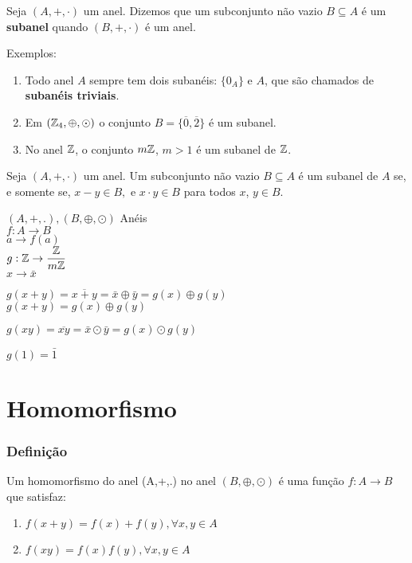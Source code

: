 \begin{definicao}
	Seja $(A,+,\cdot)$ um anel. Dizemos que um subconjunto n{\~a}o vazio $B\subseteq A$ {\'e} um \textbf{subanel} quando $(B, + , \cdot)$ \'e um anel.
\end{definicao}

Exemplos:
\begin{enumerate}
\item Todo anel $A$ sempre tem dois suban{\'e}is: $\{0_{A}\}$ e $A$, que s{\~a}o chamados de \textbf{suban{\'e}is triviais}.
\item Em $(\mathbb{Z}_4,\oplus,\odot)$ o conjunto $B = \{\overline{0}, \overline{2}\}$ \'e um subanel.
\item No anel $\mathbb{Z}$, o conjunto $m\mathbb{Z}$, $m > 1$ {\'e} um subanel de $\mathbb{Z}$.
\end{enumerate}

\begin{proposicao}
	Seja $(A,+,\cdot)$ um anel. Um subconjunto n{\~a}o vazio $B\subseteq A$ {\'e} um subanel de $A$ se, e somente se, $x - y \in B,$ e $x\cdot y \in B$ para todos $x$, $y\in B$.
\end{proposicao}

$(A,+,.),(B,\oplus,\odot)$ An{\'e}is\\
$f:A\rightarrow B$\\
$a\rightarrow f(a)$\\
$g:\mathbb{Z}\rightarrow \displaystyle\frac{\mathbb{Z}}{m\mathbb{Z}}$\\
$x\rightarrow\bar{x}$

$g(x+y)=\overline{x+y}=\bar{x}\oplus\bar{y}=g(x)\oplus g(y)$\\
$g(x+y)=g(x)\oplus g(y)$

$g(xy)=\overline{xy}=\bar{x}\odot\bar{y}=g(x)\odot g(y)$

$g(1)=\bar{1}$

\section{Homomorfismo}
\subsubsection{Defini{\c c}{\~a}o}

\begin{definicao}[Homomorfismo] Um homomorfismo do anel (A,+,.) no anel $(B,\oplus,\odot)$ {\'e} uma fun{\c c}{\~a}o $f:A\rightarrow B$ que satisfaz:
\begin{enumerate}
\item $f(x+y)=f(x)+f(y),\forall x,y\in A$
\item $f(xy)=f(x)f(y),\forall x,y\in A$
\end{enumerate}
\end{definicao}

